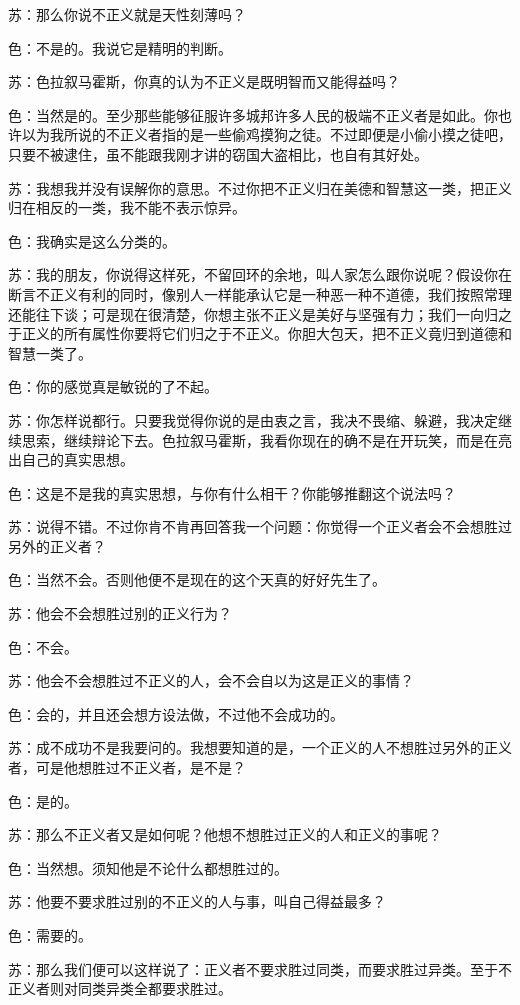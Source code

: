 \documentclass[11pt,oneside]{book}
\begin{document}
\begin{common-format}
苏：那么你说不正义就是天性刻薄吗？

色：不是的。我说它是精明的判断。

苏：色拉叙马霍斯，你真的认为不正义是既明智而又能得益吗？

色：当然是的。至少那些能够征服许多城邦许多人民的极端不正义者是如此。你也许以为我所说的不正义者指的是一些偷鸡摸狗之徒。不过即便是小偷小摸之徒吧，只要不被逮住，虽不能跟我刚才讲的窃国大盗相比，也自有其好处。

苏：我想我并没有误解你的意思。不过你把不正义归在美德和智慧这一类，把正义归在相反的一类，我不能不表示惊异。

色：我确实是这么分类的。

苏：我的朋友，你说得这样死，不留回环的余地，叫人家怎么跟你说呢？假设你在断言不正义有利的同时，像别人一样能承认它是一种恶一种不道德，我们按照常理还能往下谈；可是现在很清楚，你想主张不正义是美好与坚强有力；我们一向归之于正义的所有属性你要将它们归之于不正义。你胆大包天，把不正义竟归到道德和智慧一类了。

色：你的感觉真是敏锐的了不起。

苏：你怎样说都行。只要我觉得你说的是由衷之言，我决不畏缩、躲避，我决定继续思索，继续辩论下去。色拉叙马霍斯，我看你现在的确不是在开玩笑，而是在亮出自己的真实思想。

色：这是不是我的真实思想，与你有什么相干？你能够推翻这个说法吗？

苏：说得不错。不过你肯不肯再回答我一个问题：你觉得一个正义者会不会想胜过另外的正义者？

色：当然不会。否则他便不是现在的这个天真的好好先生了。

苏：他会不会想胜过别的正义行为？

色：不会。

苏：他会不会想胜过不正义的人，会不会自以为这是正义的事情？

色：会的，并且还会想方设法做，不过他不会成功的。

苏：成不成功不是我要问的。我想要知道的是，一个正义的人不想胜过另外的正义者，可是他想胜过不正义者，是不是？

色：是的。

苏：那么不正义者又是如何呢？他想不想胜过正义的人和正义的事呢？

色：当然想。须知他是不论什么都想胜过的。

苏：他要不要求胜过别的不正义的人与事，叫自己得益最多？

色：需要的。

苏：那么我们便可以这样说了：正义者不要求胜过同类，而要求胜过异类。至于不正义者则对同类异类全都要求胜过。


\end{common-format}
\end{document}
